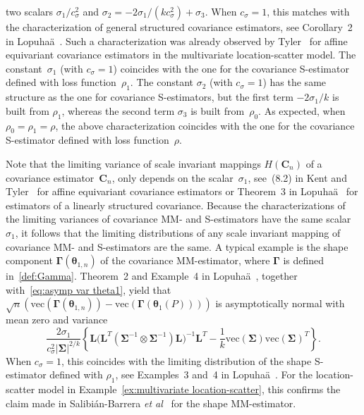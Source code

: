 \documentclass{article}
\numberwithin{equation}{section}
\theoremstyle{plain}
\newcommand{\vc}{\mathrm{vec}}
\newcommand{\btheta}{\bm\theta}
\newcommand{\bSigma}{\mathbf{\Sigma}}
\newcommand{\bGamma}{\bm\Gamma}
\newcommand{\bC}{\mathbf{C}}
\newcommand{\bL}{\mathbf{L}}
\begin{document}
two scalars $\sigma_1/c_\sigma^2$ and $\sigma_2=-2\sigma_1/(kc_\sigma^2)+\sigma_3$.
When $c_\sigma=1$,
this matches with the characterization of general structured covariance estimators,
see Corollary~2 in Lopuha\"a~\cite{lopuhaa2025}.
Such a characterization was already observed by Tyler~\cite{tyler1982} for 
affine equivariant covariance estimators in the multivariate location-scatter model.
The constant~$\sigma_1$ (with $c_\sigma=1$) coincides with the one for the covariance S-estimator defined
with loss function~$\rho_1$.
The constant $\sigma_2$ (with $c_\sigma=1$) has the same structure as the one for covariance S-estimators,
but the first term $-2\sigma_1/k$ is built from $\rho_1$,
whereas the second term $\sigma_3$ is built from~$\rho_0$.
As expected, when $\rho_0=\rho_1=\rho$, the above characterization coincides with the 
one for the covariance S-estimator defined with loss function~$\rho$.

Note that the limiting variance of scale invariant mappings $H(\bC_n)$ of a covariance estimator~$\bC_n$,
only depends on the scalar~$\sigma_1$, see~(8.2) in Kent and Tyler~\cite{kent&tyler1996} for
affine equivariant covariance estimators or Theorem~3 in Lopuha\"a~\cite{lopuhaa2025}
for estimators of a linearly structured covariance.
Because the characterizations of the limiting variances of covariance MM- and S-estimators have
the same scalar $\sigma_1$, it follows that the limiting distributions of any scale invariant mapping 
of covariance MM- and S-estimators are the same.
A typical example is the shape component $\bGamma(\btheta_{1,n})$ of the covariance MM-estimator,
where $\bGamma$ is defined in~\eqref{def:Gamma}.
Theorem~2 and Example~4 in Lopuha\"a~\cite{lopuhaa2025}, 
together with~\eqref{eq:asymp var theta1},
yield that $\sqrt{n}(\vc(\bGamma(\btheta_{1,n}))-\vc(\bGamma(\btheta_1(P))))$
is asymptotically normal with mean zero and variance
\begin{equation}
\label{eq:asymp var shape}
\frac{2\sigma_1}{c_\sigma^2|\bSigma|^{2/k}}
\left\{
\bL\Big(\bL^T\left(\bSigma^{-1}\otimes\bSigma^{-1}\right)\bL\Big)^{-1}\bL^T
-
\frac{1}{k}
\vc(\bSigma)
\vc(\bSigma)^T
\right\}.
\end{equation}
When $c_\sigma=1$, this coincides with the limiting distribution
of the shape S-estimator defined with $\rho_1$,
see Examples~3 and~4 in Lopuha\"a~\cite{lopuhaa2025}.
For the location-scatter model in Example~\ref{ex:multivariate location-scatter},
this confirms the claim made in Salibi\'an-Barrera \emph{et al}~\cite{SalibianBarrera-VanAelst-Willems2006}
for the shape MM-estimator.
\end{document}
